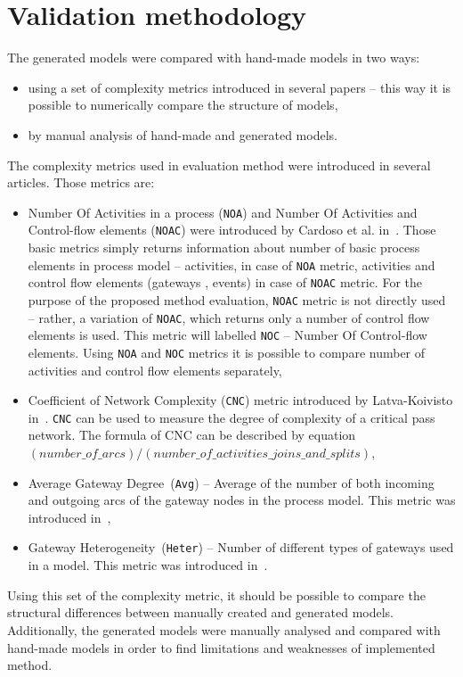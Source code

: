 \section{Validation methodology}
The generated models were compared with hand-made models  in two ways:
\begin{itemize}
	\item using a set of complexity metrics introduced in several papers -- this way it is possible to numerically compare the structure of models,
	\item by manual analysis of hand-made and generated models.
\end{itemize}
The complexity metrics used in evaluation method were introduced in several articles. Those metrics are:
\begin{itemize}
	\item Number Of Activities in a process (\texttt{NOA}) and Number Of Activities and Control-flow elements (\texttt{NOAC}) were introduced by Cardoso et al. in~\cite{cardoso-metrics}. Those basic metrics simply returns information about number of basic process elements in process model -- activities, in case of \texttt{NOA} metric, activities and control flow elements (gateways , events) in case of \texttt{NOAC} metric. For the purpose of the proposed method evaluation, \texttt{NOAC} metric is not directly used -- rather, a variation of \texttt{NOAC}, which returns only a number of control flow elements is used. This metric will labelled \texttt{NOC} -- Number Of Control-flow elements. Using \texttt{NOA} and \texttt{NOC} metrics it is possible to compare number of activities and control flow elements separately,
	\item Coefficient of Network Complexity (\texttt{CNC}) metric introduced by Latva-Koivisto in~\cite{latva-metric}. \texttt{CNC} can be used to measure the degree of complexity of a critical pass network. The formula of CNC can be described by equation $ (number\_of\_arcs)/(number\_of\_activities\_joins\_and\_splits) $,
	\item Average Gateway Degree~(\texttt{Avg}) -- Average of the number of both incoming and outgoing arcs of the gateway
	nodes in the process model. This metric was introduced in~\cite{sanchez-metric},
	\item Gateway Heterogeneity~(\texttt{Heter}) -- Number of different types of gateways used in a model. This metric was introduced in~\cite{sanchez-metric}.
\end{itemize}
Using this set of the complexity metric, it should be possible to compare the structural differences between manually created and generated models. Additionally, the generated models were manually analysed and compared with hand-made models in order to find limitations and weaknesses of implemented method.

